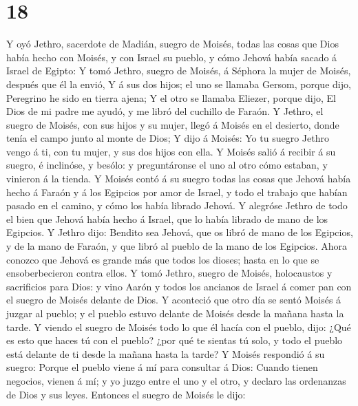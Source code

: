 \hypertarget{section-17}{%
\section{18}\label{section-17}}

 Y oyó Jethro, sacerdote de Madián, suegro de Moisés,
todas las cosas que Dios había hecho con Moisés, y con Israel su pueblo,
y cómo Jehová había sacado á Israel de Egipto:  Y tomó
Jethro, suegro de Moisés, á Séphora la mujer de Moisés, después que él
la envió,  Y á sus dos hijos; el uno se llamaba Gersom,
porque dijo, Peregrino he sido en tierra ajena;  Y el otro
se llamaba Eliezer, porque dijo, El Dios de mi padre me ayudó, y me
libró del cuchillo de Faraón.  Y Jethro, el suegro de
Moisés, con sus hijos y su mujer, llegó á Moisés en el desierto, donde
tenía el campo junto al monte de Dios;  Y dijo á Moisés:
Yo tu suegro Jethro vengo á ti, con tu mujer, y sus dos hijos con ella.
 Y Moisés salió á recibir á su suegro, é inclinóse, y
besólo: y preguntáronse el uno al otro cómo estaban, y vinieron á la
tienda.  Y Moisés contó á su suegro todas las cosas que
Jehová había hecho á Faraón y á los Egipcios por amor de Israel, y todo
el trabajo que habían pasado en el camino, y cómo los había librado
Jehová.  Y alegróse Jethro de todo el bien que Jehová
había hecho á Israel, que lo había librado de mano de los Egipcios.
 Y Jethro dijo: Bendito sea Jehová, que os libró de mano
de los Egipcios, y de la mano de Faraón, y que libró al pueblo de la
mano de los Egipcios.  Ahora conozco que Jehová es grande
más que todos los dioses; hasta en lo que se ensoberbecieron contra
ellos.  Y tomó Jethro, suegro de Moisés, holocaustos y
sacrificios para Dios: y vino Aarón y todos los ancianos de Israel á
comer pan con el suegro de Moisés delante de Dios.  Y
aconteció que otro día se sentó Moisés á juzgar al pueblo; y el pueblo
estuvo delante de Moisés desde la mañana hasta la tarde. 
Y viendo el suegro de Moisés todo lo que él hacía con el pueblo, dijo:
¿Qué es esto que haces tú con el pueblo? ¿por qué te sientas tú solo, y
todo el pueblo está delante de ti desde la mañana hasta la tarde?
 Y Moisés respondió á su suegro: Porque el pueblo viene á
mí para consultar á Dios:  Cuando tienen negocios, vienen
á mí; y yo juzgo entre el uno y el otro, y declaro las ordenanzas de
Dios y sus leyes.  Entonces el suegro de Moisés le dijo:
